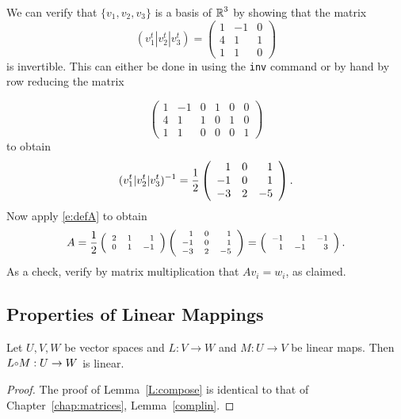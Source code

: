\documentclass{ximera}
\begin{document}
We can verify that $\{v_1,v_2,v_3\}$ is a basis of $\mbox{$\mathbb{R}$}^3$ by
showing that the matrix
\[
(v_1^t|v_2^t|v_3^t) = \left(\begin{array}{rrr}
1 & -1 & 0  \\
4 & 1 & 1  \\
1 & 1 & 0  \end{array}\right)
\]
is invertible.  This can either be done in \Matlab using the
{\tt inv} command or by hand by row reducing the matrix

\[
\left(\begin{array}{rrr|ccc}
1 & -1 & 0 & 1 & 0 & 0 \\
4 &  1 & 1 & 0 & 1 & 0 \\
1 &  1 & 0 & 0 & 0 & 1  \end{array}\right)
\]
to obtain
\[
(v_1^t|v_2^t|v_3^t)^{-1} = \frac{1}{2}\left(\begin{array}{rrr}
 1 & 0 &  1 \\
-1 & 0 &  1 \\
-3 & 2 & -5
\end{array}\right).
\]
Now apply \eqref{e:defA} to obtain
\[
\scriptsize
A = \frac{1}{2} \left(\begin{array}{rrr} 2 & 1 & 1\\ 0 & 1 & -1
\end{array}\right) \left(\begin{array}{rrr}
 1 & 0 &  1 \\
-1 & 0 &  1 \\
-3 & 2 & -5
\end{array}\right) = \left(\begin{array}{rrr} -1 & 1 & -1 \\ 1 & -1 & 3
\end{array}\right).
\]
As a check, verify by matrix multiplication that $Av_i=w_i$, as claimed.


\subsection*{Properties of Linear Mappings}

\begin{lemma} \label{L:compose}
Let $U,V,W$ be vector spaces and $L:V\to W$ and $M:U\to V$ be linear maps.
Then $L\compose M :U\to W$ is linear.
\end{lemma}

\begin{proof} The proof of Lemma~\ref{L:compose} is identical to that of
Chapter~\ref{chap:matrices}, Lemma~\ref{complin}. \end{proof}
\end{document}
